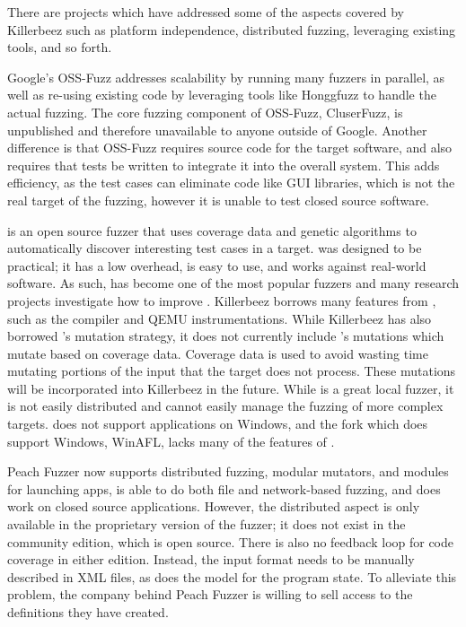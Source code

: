 There are projects which have addressed some of the aspects covered by Killerbeez
such as platform independence, distributed fuzzing, leveraging existing tools,
and so forth.

Google's OSS-Fuzz\cite{ossfuzz} addresses scalability by running many fuzzers
in parallel, as well as re-using existing code by leveraging tools like
Honggfuzz to handle the actual fuzzing. The core fuzzing component of OSS-Fuzz,
CluserFuzz, is unpublished and therefore unavailable to anyone outside of
Google.  Another difference is that OSS-Fuzz requires source code for the
target software, and also requires that tests be written to integrate it
into the overall system. This adds efficiency, as the test cases can eliminate
code like GUI libraries, which is not the real target of the fuzzing, however
it is unable to test closed source software.

\AFL{}\cite{afl} is an open source fuzzer that uses coverage data and genetic
algorithms to automatically discover interesting test cases in a target.  \AFL{}
was designed to be practical; it has a low overhead, is easy to use, and works
against real-world software. As such, \AFL{} has become one of the most popular
fuzzers and many research projects investigate how to improve \AFL{}. Killerbeez
borrows many features from \AFL{}, such as the compiler and QEMU
instrumentations. While Killerbeez has also borrowed \AFL{}'s mutation strategy,
it does not currently include \AFL{}'s mutations which mutate based on coverage
data. Coverage data is used to avoid wasting time mutating portions of the input
that the target does not process. These mutations will be incorporated into
Killerbeez in the future.  While \AFL{} is a great local fuzzer, it is not
easily distributed and cannot easily manage the fuzzing of more complex targets.
\AFL{} does not support applications on Windows, and the \AFL{} fork which does
support Windows, WinAFL, lacks many of the features of \AFL{}.

Peach Fuzzer\cite{peach} now supports distributed fuzzing, modular mutators, and
modules for launching apps, is able to do both file and network-based fuzzing,
and does work on closed source applications.  However, the distributed aspect
is only available in the proprietary version of the fuzzer; it does not exist
in the community edition, which is open source. There is also no feedback loop
for code coverage in either edition.  Instead, the input format needs to be
manually described in XML files, as does the model for the program state. To
alleviate this problem, the company behind Peach Fuzzer is willing to sell
access to the definitions they have created.

